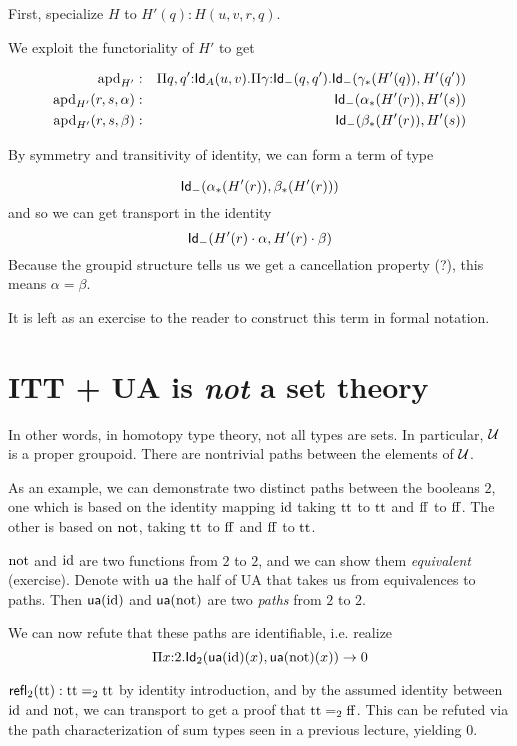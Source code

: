 \documentclass[11pt]{article}
\begin{document}
First, specialize $H$ to $H'(q) : H(u,v,r,q)$.

We exploit the functoriality of $H'$ to get

\begin{eqnarray*}
\operatorname{apd}_{H'} &:& \Pi{q,q'}{:}\mathsf{Id}_{A}(u,v).
                \Pi{\gamma}{:}\mathsf{Id}_{-}(q,q').
                  \mathsf{Id}_{-}(\gamma_{*}(H'(q)), H'(q'))\\
\operatorname{apd}_{H'}(r,s,\alpha) &:& \mathsf{Id}_{-}(\alpha_{*}(H'(r)), H'(s))\\
\operatorname{apd}_{H'}(r,s,\beta) &:& \mathsf{Id}_{-}(\beta_*{}(H'(r)), H'(s))
\end{eqnarray*}

By symmetry and transitivity of identity, we can form a term of type

\[
\mathsf{Id}_{-}(\alpha_*(H'(r)), \beta_*(H'(r)))
\]
and so we can get transport in the identity
\[
\mathsf{Id}_{-}(H'(r)\cdot \alpha, H'(r)\cdot\beta)
\]
Because the groupid structure tells us we get a cancellation property (?),
this means $\alpha = \beta$.

It is left as an exercise to the reader to construct this term in formal
notation.


\section{ITT + UA is {\em not} a set theory}

In other words, in homotopy type theory, not all types are sets. In
particular, $\mathcal{U}$ is a proper groupoid. There are nontrivial paths
between the elements of $\mathcal{U}$.

As an example, we can demonstrate two distinct paths between the booleans
$2$, one which is based on the identity mapping $\operatorname{id}$ taking $\operatorname{tt}$
to $\operatorname{tt}$ and $\operatorname{ff}$ to $\operatorname{ff}$. The other is based on $\operatorname{not}$,
taking $\operatorname{tt}$ to $\operatorname{ff}$ and $\operatorname{ff}$ to $\operatorname{tt}$.

$\operatorname{not}$ and $\operatorname{id}$ are two functions from ${2}$ to ${2}$, and we can
show them {\em equivalent} (exercise). Denote with $\mathsf{ua}$ the 
half of UA that takes us from equivalences to paths. Then
$\mathsf{ua}(\operatorname{id})$ and
$\mathsf{ua}(\operatorname{not})$ are two {\em paths} from $2$ to $2$. 

We can now refute that these paths are identifiable, i.e. realize
\[
\Pi x{:}2.\mathsf{Id}_{2}(\mathsf{ua}(\operatorname{id})(x),\mathsf{ua}(\operatorname{not})(x)) \to 0
\]

$\mathsf{refl}_2(\operatorname{tt}) : \operatorname{tt} =_2 \operatorname{tt}$ by identity introduction,
and by the assumed identity between $\operatorname{id}$ and $\operatorname{not}$, we can
transport to get a proof that $\operatorname{tt} =_2 \operatorname{ff}$. This can be refuted
via the path characterization of sum types seen in a previous lecture,
yielding $0$.
\end{document}
